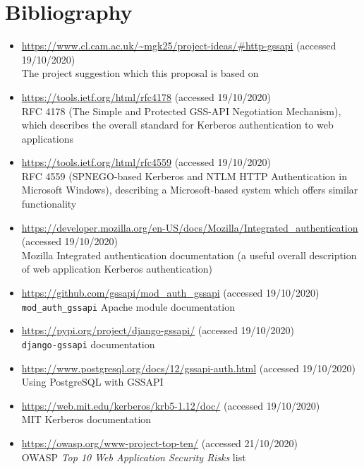 \documentclass{standalone}
\begin{document}
\section*{Bibliography}
\begin{itemize}
\item \url{https://www.cl.cam.ac.uk/~mgk25/project-ideas/#http-gssapi} (accessed 19/10/2020) \\ The project suggestion which this proposal is based on
\item \url{https://tools.ietf.org/html/rfc4178} (accessed 19/10/2020) \\ RFC 4178 (The Simple and Protected GSS-API Negotiation Mechanism), which describes the overall standard for Kerberos authentication to web applications
\item \url{https://tools.ietf.org/html/rfc4559} (accessed 19/10/2020) \\ RFC 4559 (SPNEGO-based Kerberos and NTLM HTTP Authentication in Microsoft Windows), describing a Microsoft-based system which offers similar functionality
\item \url{https://developer.mozilla.org/en-US/docs/Mozilla/Integrated_authentication} (accessed 19/10/2020) \\ Mozilla Integrated authentication documentation (a useful overall description of web application Kerberos authentication)
\item \url{https://github.com/gssapi/mod_auth_gssapi} (accessed 19/10/2020) \\ \verb+mod_auth_gssapi+ Apache module documentation
\item \url{https://pypi.org/project/django-gssapi/} (accessed 19/10/2020)  \\ \verb+django-gssapi+ documentation
\item \url{https://www.postgresql.org/docs/12/gssapi-auth.html} (accessed 19/10/2020) \\ Using PostgreSQL with GSSAPI
\item \url{https://web.mit.edu/kerberos/krb5-1.12/doc/} (accessed 19/10/2020) \\ MIT Kerberos documentation
\item \url{https://owasp.org/www-project-top-ten/} (accessed 21/10/2020) \\  OWASP \textit{Top 10 Web Application Security Risks} list
\end{itemize}
\end{document}
